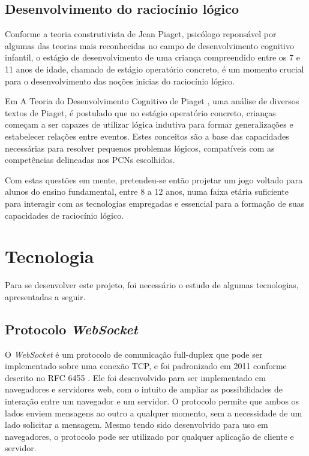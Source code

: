 \subsection{Desenvolvimento do raciocínio lógico}

Conforme a teoria construtivista de Jean Piaget, psicólogo reponsável por algumas
das teorias mais reconhecidas no campo de desenvolvimento cognitivo infantil, o
estágio de desenvolvimento de uma criança compreendido entre os 7 e 11 anos de 
idade, chamado de estágio operatório concreto, é um momento crucial para o 
desenvolvimento das noções inicias do raciocínio lógico. 

Em A Teoria do Desenvolvimento Cognitivo de Piaget \cite{opper:1969:theory_intellectual_development},
uma análise de diversos textos de Piaget, é postulado que no estágio operatório
concreto, crianças começam a ser capazes de utilizar lógica indutiva para formar
generalizações e estabelecer relações entre eventos. Estes conceitos são a base
das capacidades necessárias para resolver pequenos problemas lógicos, compatíveis
com as competências delineadas nos PCNs escolhidos.

Com estas questões em mente, pretendeu-se então projetar um jogo voltado para
alunos do ensino fundamental, entre 8 a 12 anos, numa faixa etária suficiente
para interagir com as tecnologias empregadas e essencial para a formação de
suas capacidades de raciocínio lógico.

\section{Tecnologia}\label{sec-tecnologia}

Para se desenvolver este projeto, foi necessário o estudo de algumas tecnologias, apresentadas a seguir. 
\subsection{Protocolo \textit{WebSocket}}\label{subsec-teo-websocket}

O \textit{WebSocket} é um protocolo de comunicação full-duplex que pode ser implementado
sobre uma conexão TCP, e foi padronizado em 2011 conforme descrito no RFC 6455
\cite{RFC:2011:websocket}. Ele foi desenvolvido para ser implementado em 
navegadores e servidores web, com o intuito de ampliar as possibilidades de
interação entre um navegador e um servidor. O protocolo permite que ambos os 
lados enviem mensagens ao outro a qualquer momento, sem a necessidade de um 
lado solicitar a mensagem. Mesmo tendo sido desenvolvido para uso em navegadores, 
o protocolo pode ser utilizado por qualquer aplicação de cliente e servidor.

